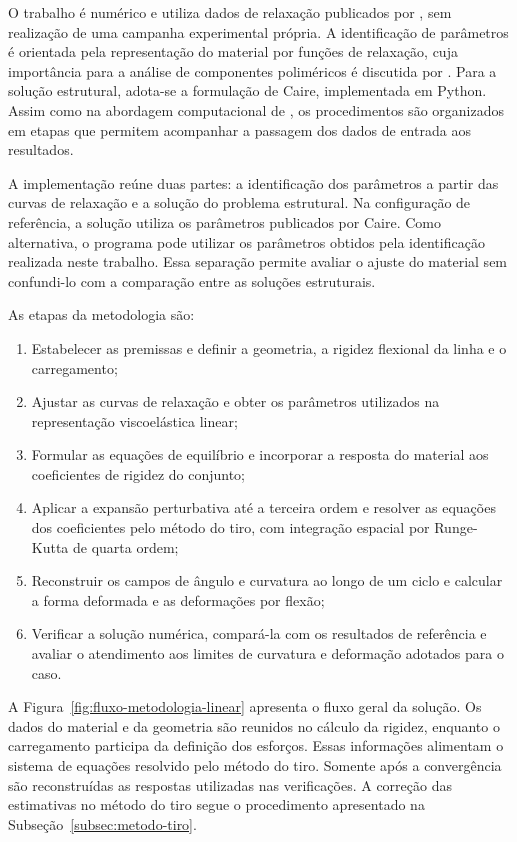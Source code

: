 \documentclass[arial,centeredequations,english,brazilian,oneside,section=TITLE]{ifes8}
\begin{document}
O trabalho é numérico e utiliza dados de relaxação publicados por ,
sem realização de uma campanha experimental própria. A identificação de parâmetros é orientada
pela representação do material por funções de relaxação, cuja importância para a análise de
componentes poliméricos é discutida por . Para a solução estrutural,
adota-se a formulação de Caire, implementada em Python. Assim como na abordagem computacional
de , os procedimentos são organizados em etapas que permitem acompanhar
a passagem dos dados de entrada aos resultados.

A implementação reúne duas partes: a identificação dos parâmetros a partir das curvas de
relaxação e a solução do problema estrutural. Na configuração de referência, a solução utiliza
os parâmetros publicados por Caire. Como alternativa, o programa pode utilizar os parâmetros
obtidos pela identificação realizada neste trabalho. Essa separação permite avaliar o ajuste
do material sem confundi-lo com a comparação entre as soluções estruturais.

As etapas da metodologia são:
\begin{enumerate}
  \item Estabelecer as premissas e definir a geometria, a rigidez flexional da linha e o
  carregamento;
  \item Ajustar as curvas de relaxação e obter os parâmetros utilizados na representação
  viscoelástica linear;
  \item Formular as equações de equilíbrio e incorporar a resposta do material aos
  coeficientes de rigidez do conjunto;
  \item Aplicar a expansão perturbativa até a terceira ordem e resolver as equações dos
  coeficientes pelo método do tiro, com integração espacial por Runge-Kutta de quarta ordem;
  \item Reconstruir os campos de ângulo e curvatura ao longo de um ciclo e calcular a forma
  deformada e as deformações por flexão;
  \item Verificar a solução numérica, compará-la com os resultados de referência e avaliar
  o atendimento aos limites de curvatura e deformação adotados para o caso.
\end{enumerate}

A Figura~\ref{fig:fluxo-metodologia-linear} apresenta o fluxo geral da solução. Os dados do
material e da geometria são reunidos no cálculo da rigidez, enquanto o carregamento participa
da definição dos esforços. Essas informações alimentam o sistema de equações resolvido
pelo método do tiro. Somente após a convergência são reconstruídas as respostas utilizadas
nas verificações. A correção das estimativas no método do tiro segue o procedimento
apresentado na Subseção~\ref{subsec:metodo-tiro}.
\end{document}
